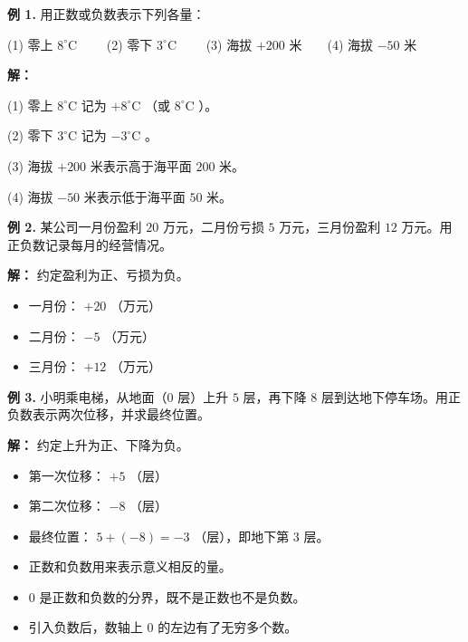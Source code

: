 \begin{workedexamples}


\textbf{例 1.} 用正数或负数表示下列各量：

(1) 零上 $8^\circ\text{C}$ 　　(2) 零下 $3^\circ\text{C}$ 　　(3) 海拔 $+200$ 米　　(4) 海拔 $-50$ 米

\textbf{解：}

(1) 零上 $8^\circ\text{C}$ 记为 $+8^\circ\text{C}$ （或 $8^\circ\text{C}$ ）。

(2) 零下 $3^\circ\text{C}$ 记为 $-3^\circ\text{C}$ 。

(3) 海拔 $+200$ 米表示高于海平面 $200$ 米。

(4) 海拔 $-50$ 米表示低于海平面 $50$ 米。

\textbf{例 2.} 某公司一月份盈利 $20$ 万元，二月份亏损 $5$ 万元，三月份盈利 $12$ 万元。用正负数记录每月的经营情况。

\textbf{解：} 约定盈利为正、亏损为负。

\begin{itemize}
  \item 一月份： $+20$ （万元）
  \item 二月份： $-5$ （万元）
  \item 三月份： $+12$ （万元）
\end{itemize}


\textbf{例 3.} 小明乘电梯，从地面（0 层）上升 $5$ 层，再下降 $8$ 层到达地下停车场。用正负数表示两次位移，并求最终位置。

\textbf{解：} 约定上升为正、下降为负。

\begin{itemize}
  \item 第一次位移： $+5$ （层）
  \item 第二次位移： $-8$ （层）
  \item 最终位置： $5 + (-8) = -3$ （层），即地下第 $3$ 层。
\end{itemize}


\end{workedexamples}

\begin{keytakeaway}


\begin{itemize}
  \item 正数和负数用来表示意义相反的量。
  \item $0$ 是正数和负数的分界，既不是正数也不是负数。
  \item 引入负数后，数轴上 $0$ 的左边有了无穷多个数。
\end{itemize}


\end{keytakeaway}

